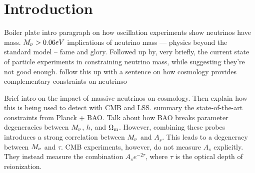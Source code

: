 \section{Introduction}
Boiler plate intro paragraph on how oscillation experiments show neutrinos have mass. 
$M_\nu > 0.06eV$
implications of neutrino mass --- physics beyond the standard model -- fame and glory. 
Followed up by, very briefly, the current state of particle experiments in constraining
neutrino mass, while suggesting they're not good enough. 
follow this up with a sentence on how cosmology provides complementary constraints on 
neutrinso

Brief intro on the impact of massive neutrinos on cosmology.
Then explain how this is being used to detect with CMB and LSS. 
summary the state-of-the-art constraints from Planck + BAO.
Talk about how BAO breaks parameter degeneracies between $M_\nu$, 
$h$, and $\Omega_{\rm m}$. However, combining these probes introduces a strong
correlation between $M_\nu$ and $A_s$. This leads to a degeneracy
between $M_\nu$ and $\tau$. 
\cite{archidiacono2017}
CMB experiments, however, do not 
measure $A_s$ explicitly. They instead measure the combination 
$A_se^{-2\tau}$, where $\tau$ is the optical depth of reionization. 


